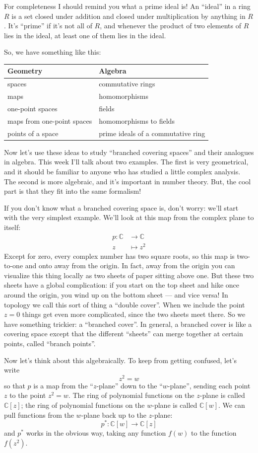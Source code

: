 \documentclass{article}
\begin{document}
For completeness I should remind you what a prime ideal is! An ``ideal''
in a ring \(R\) is a set closed under addition and closed under
multiplication by anything in \(R\). It's ``prime'' if it's not all of
\(R\), and whenever the product of two elements of \(R\) lies in the
ideal, at least one of them lies in the ideal.

So, we have something like this:

\begin{longtable}[]{@{}ll@{}}
\toprule
Geometry & Algebra\tabularnewline
\midrule
\endhead
spaces & commutative rings\tabularnewline
maps & homomorphisms\tabularnewline
one-point spaces & fields\tabularnewline
maps from one-point spaces & homomorphisms to fields\tabularnewline
points of a space & prime ideals of a commutative ring\tabularnewline
\bottomrule
\end{longtable}

Now let's use these ideas to study ``branched covering spaces'' and
their analogues in algebra. This week I'll talk about two examples. The
first is very geometrical, and it should be familiar to anyone who has
studied a little complex analysis. The second is more algebraic, and
it's important in number theory. But, the cool part is that they fit
into the same formalism!

If you don't know what a branched covering space is, don't worry: we'll
start with the very simplest example. We'll look at this map from the
complex plane to itself: \[
  \begin{aligned}
    p\colon \mathbb{C} &\to \mathbb{C}
  \\z &\mapsto z^2
  \end{aligned}
\] Except for zero, every complex number has two square roots, so this
map is two-to-one and onto away from the origin. In fact, away from the
origin you can visualize this thing locally as two sheets of paper
sitting above one. But these two sheets have a global complication: if
you start on the top sheet and hike once around the origin, you wind up
on the bottom sheet --- and vice versa! In topology we call this sort of
thing a ``double cover''. When we include the point \(z = 0\) things get
even more complicated, since the two sheets meet there. So we have
something trickier: a ``branched cover''. In general, a branched cover
is like a covering space except that the different ``sheets'' can merge
together at certain points, called ``branch points''.

Now let's think about this algebraically. To keep from getting confused,
let's write \[z^2 = w\] so that \(p\) is a map from the ``\(z\)-plane''
down to the ``\(w\)-plane'', sending each point \(z\) to the point
\(z^2 = w\). The ring of polynomial functions on the \(z\)-plane is
called \(\mathbb{C}[z]\); the ring of polynomial functions on the
\(w\)-plane is called \(\mathbb{C}[w]\). We can pull functions from the
\(w\)-plane back up to the \(z\)-plane:
\[p^*\colon \mathbb{C}[w] \to \mathbb{C}[z]\] and \(p^*\) works in the
obvious way, taking any function \(f(w)\) to the function \(f(z^2)\).
\end{document}
